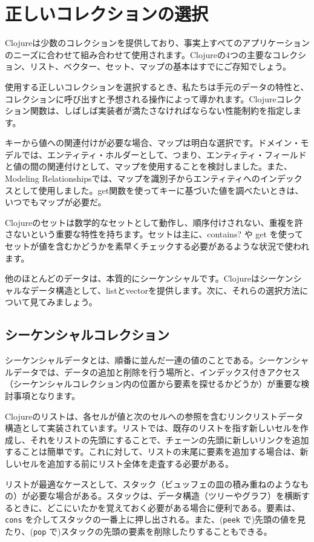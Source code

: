 \section{正しいコレクションの選択}

Clojureは少数のコレクションを提供しており、事実上すべてのアプリケーションのニーズに合わせて組み合わせて使用されます。Clojureの4つの主要なコレクション、リスト、ベクター、セット、マップの基本はすでにご存知でしょう。

使用する正しいコレクションを選択するとき、私たちは手元のデータの特性と、コレクションに呼び出すと予想される操作によって導かれます。Clojureコレクション関数は、しばしば実装者が満たさなければならない性能制約を指定します。

キーから値への関連付けが必要な場合、マップは明白な選択です。ドメイン・モデルでは、エンティティ・ホルダーとして、つまり、エンティティ・フィールドと値の間の関連付けとして、マップを使用することを検討しました。また、Modeling Relationshipsでは、マップを識別子からエンティティへのインデックスとして使用しました。get関数を使ってキーに基づいた値を調べたいときは、いつでもマップが必要だ。

Clojureのセットは数学的なセットとして動作し、順序付けされない、重複を許さないという重要な特性を持ちます。セットは主に、contains? や get を使ってセットが値を含むかどうかを素早くチェックする必要があるような状況で使われます。

他のほとんどのデータは、本質的にシーケンシャルです。Clojureはシーケンシャルなデータ構造として、listとvectorを提供します。次に、それらの選択方法について見てみましょう。

\subsection{シーケンシャルコレクション}

シーケンシャルデータとは、順番に並んだ一連の値のことである。シーケンシャルデータでは、データの追加と削除を行う場所と、インデックス付きアクセス（シーケンシャルコレクション内の位置から要素を探せるかどうか）が重要な検討事項となります。

Clojureのリストは、各セルが値と次のセルへの参照を含むリンクリストデータ構造として実装されています。リストでは、既存のリストを指す新しいセルを作成し、それをリストの先頭にすることで、チェーンの先頭に新しいリンクを追加することは簡単です。これに対して、リストの末尾に要素を追加する場合は、新しいセルを追加する前にリスト全体を走査する必要がある。

リストが最適なケースとして、スタック（ビュッフェの皿の積み重ねのようなもの）が必要な場合がある。スタックは、データ構造（ツリーやグラフ）を横断するときに、どこにいたかを覚えておく必要がある場合に便利である。要素は、\texttt{cons} を介してスタックの一番上に押し出される。また、(\texttt{peek} で)先頭の値を見たり、(\texttt{pop} で)スタックの先頭の要素を削除したりすることもできる。

